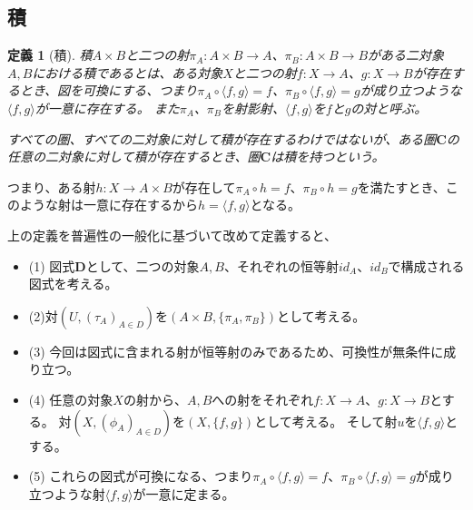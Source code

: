 \documentclass[dvipdfmx]{jsarticle}
\newcommand{\cat}[1]{\boldsymbol{#1}}
\newcommand{\arrow}{\rightarrow}
\newcommand{\tuple}[1]{\langle #1\rangle}
\newcommand{\mor}[3]{#1:#2\arrow #3}
\newtheorem{define}{定義}[section]
\begin{document}
	\subsection{積}
	\begin{define}[積]

		積$A\times B$と二つの射$\mor{\pi_A}{A\times B}{A}$、$\mor{\pi_B}{A\times B}{B}$がある二対象$A,B$における積であるとは、ある対象$X$と二つの射$\mor{f}{X}{A}$、$\mor{g}{X}{B}$が存在するとき、図を可換にする、つまり$\pi_A\circ\tuple{f,g}=f$、$\pi_B\circ\tuple{f,g}=g$が成り立つような$\tuple{f,g}$が一意に存在する。
		また$\pi_A$、$\pi_B$を射影射、$\tuple{f,g}$を$f$と$g$の対と呼ぶ。

		すべての圏、すべての二対象に対して積が存在するわけではないが、ある圏$\cat{C}$の任意の二対象に対して積が存在するとき、圏$\cat{C}$は積を持つという。

		\begin{center}
		\end{center}
	\end{define}

	つまり、ある射$\mor{h}{X}{A\times B}$が存在して$\pi_A\circ h=f$、$\pi_B\circ h=g$を満たすとき、このような射は一意に存在するから$h=\tuple{f,g}$となる。

	上の定義を普遍性の一般化に基づいて改めて定義すると、
	\begin{itemize}
		\item (1)
		図式$\cat{D}$として、二つの対象$A,B$、それぞれの恒等射$id_A$、$id_B$で構成される図式を考える。
		\item (2)対$(U,(\tau_A)_{A\in D})$を$(A\times B,\{\pi_A,\pi_B\})$として考える。
		\item (3)
		今回は図式に含まれる射が恒等射のみであるため、可換性が無条件に成り立つ。
		\item (4)
		任意の対象$X$の射から、$A,B$への射をそれぞれ$\mor{f}{X}{A}$、$\mor{g}{X}{B}$とする。
		対$(X,(\phi_A)_{A\in D})$を$(X,\{f,g\})$として考える。
		そして射$u$を$\tuple{f,g}$とする。
		\item (5)
		これらの図式が可換になる、つまり$\pi_A\circ\tuple{f,g}=f$、$\pi_B\circ\tuple{f,g}=g$が成り立つような射$\tuple{f,g}$が一意に定まる。
	\end{itemize}
\end{document}
